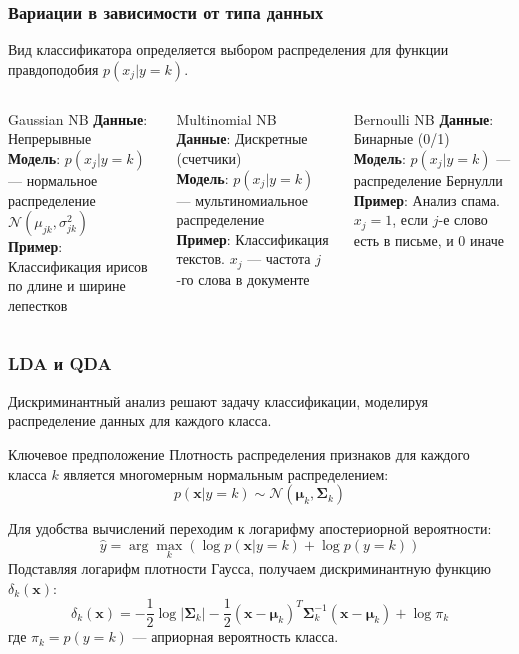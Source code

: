 \documentclass[notheorems, handout]{beamer}
\newcommand{\vect}[1]{\mathbf{#1}}
\newcommand{\matr}[1]{\boldsymbol{#1}}
\begin{document}
\begin{frame}
  \frametitle{Вариации в зависимости от типа данных}
  Вид классификатора определяется выбором распределения для функции правдоподобия $p(x_j|y=k)$.
  
  \begin{columns}[T]
      \begin{block}{Gaussian NB}
        \textbf{Данные}: Непрерывные\\
        \textbf{Модель}: $p(x_j|y=k)$ --- нормальное распределение $\mathcal{N}(\mu_{jk}, \sigma_{jk}^2)$\\
        \textbf{Пример}: Классификация ирисов по длине и ширине лепестков
      \end{block}
      
      \begin{block}{Multinomial NB}
        \textbf{Данные}: Дискретные (счетчики)\\
        \textbf{Модель}: $p(x_j|y=k)$ --- мультиномиальное распределение\\
        \textbf{Пример}: Классификация текстов. $x_j$ --- частота $j$-го слова в документе
      \end{block}
      
      \begin{block}{Bernoulli NB}
        \textbf{Данные}: Бинарные (0/1)\\
        \textbf{Модель}: $p(x_j|y=k)$ --- распределение Бернулли\\
        \textbf{Пример}: Анализ спама. $x_j=1$, если $j$-е слово есть в письме, и $0$ иначе
      \end{block}
  \end{columns}
\end{frame}

\begin{frame}
    \frametitle{LDA и QDA}
    Дискриминантный анализ  решают задачу классификации, моделируя распределение данных для каждого класса.
    \begin{block}{Ключевое предположение}
     Плотность распределения признаков для каждого класса $k$ является многомерным нормальным распределением:
     $$ p(\vect{x}|y=k) \sim \mathcal{N}(\matr{\mu}_k, \matr{\Sigma}_k) $$
    \end{block}
    Для удобства вычислений переходим к логарифму апостериорной вероятности:
    $$ \hat{y} = \arg\max_k \left( \log p(\vect{x}|y=k) + \log p(y=k) \right) $$
    Подставляя логарифм плотности Гаусса, получаем дискриминантную функцию $\delta_k(\vect{x})$:
    $$ \delta_k(\vect{x}) = -\frac{1}{2}\log|\matr{\Sigma}_k| - \frac{1}{2}(\vect{x}-\matr{\mu}_k)^T\matr{\Sigma}_k^{-1}(\vect{x}-\matr{\mu}_k) + \log \pi_k $$
    где $\pi_k = p(y=k)$ --- априорная вероятность класса.
\end{frame}
\end{document}
